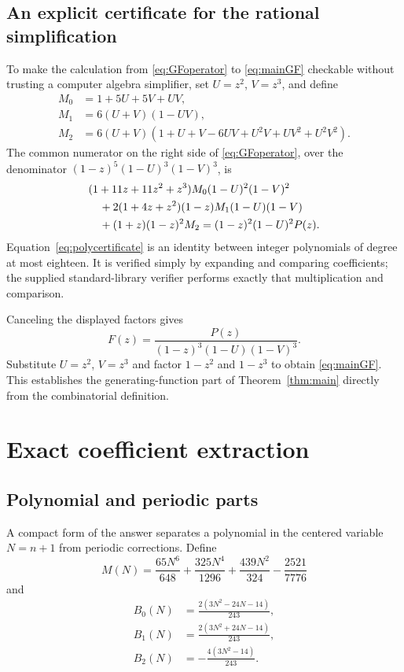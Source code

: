 \documentclass[11pt]{article}
\numberwithin{equation}{section}
\theoremstyle{definition}
\begin{document}
\subsection{An explicit certificate for the rational simplification}
To make the calculation from \eqref{eq:GFoperator} to \eqref{eq:mainGF}
checkable without trusting a computer algebra simplifier, set $U=z^2$,
$V=z^3$, and define
\begin{align*}
 M_0&=1+5U+5V+UV,\\
 M_1&=6(U+V)(1-UV),\\
 M_2&=6(U+V)(1+U+V-6UV+U^2V+UV^2+U^2V^2).
\end{align*}
The common numerator on the right side of \eqref{eq:GFoperator}, over the
denominator $(1-z)^5(1-U)^3(1-V)^3$, is
\begin{align}\label{eq:polycertificate}
 &(1+11z+11z^2+z^3)M_0(1-U)^2(1-V)^2\notag\\
 &\quad+2(1+4z+z^2)(1-z)M_1(1-U)(1-V)\notag\\
 &\quad+(1+z)(1-z)^2M_2
   =(1-z)^2(1-U)^2P(z).
\end{align}
Equation~\eqref{eq:polycertificate} is an identity between integer
polynomials of degree at most eighteen. It is verified simply by expanding
and comparing coefficients; the supplied standard-library verifier performs
exactly that multiplication and comparison.

Canceling the displayed factors gives
\[
 F(z)=\frac{P(z)}{(1-z)^3(1-U)(1-V)^3}.
\]
Substitute $U=z^2$, $V=z^3$ and factor $1-z^2$ and $1-z^3$ to obtain
\eqref{eq:mainGF}. This establishes the generating-function part of
Theorem~\ref{thm:main} directly from the combinatorial definition.

\section{Exact coefficient extraction}
\label{sec:extract}

\subsection{Polynomial and periodic parts}
A compact form of the answer separates a polynomial in the centered variable
$N=n+1$ from periodic corrections. Define
\begin{equation}\label{eq:M}
 M(N)=\frac{65N^6}{648}+\frac{325N^4}{1296}
      +\frac{439N^2}{324}-\frac{2521}{7776}
\end{equation}
and
\begin{equation}\label{eq:B}
\begin{split}
 B_0(N)&=\frac{2(3N^2-24N-14)}{243},\\
 B_1(N)&=\frac{2(3N^2+24N-14)}{243},\\
 B_2(N)&=-\frac{4(3N^2-14)}{243}.
\end{split}
\end{equation}
\end{document}
